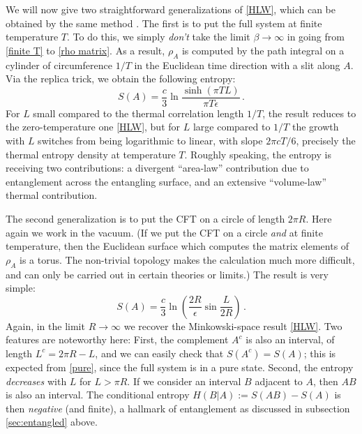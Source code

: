 \documentclass[11pt]{article}
\begin{document}
We will now give two straightforward generalizations of \eqref{HLW}, which can be obtained by the same method \cite{Calabrese:2004eu}. The first is to put the full system at finite temperature $T$. To do this, we simply \emph{don't} take the limit $\beta\to\infty$ in going from \eqref{finite T} to \eqref{rho matrix}. As a result, $\rho_A$ is computed by the path integral on a cylinder of circumference $1/T$ in the Euclidean time direction with a slit along $A$. Via the replica trick, we obtain the following entropy:
\begin{equation}\label{thermal line}
S(A) = \frac c3\ln\frac{\sinh(\pi TL)}{\pi T\epsilon}\,.
\end{equation}
For $L$ small compared to the thermal correlation length $1/T$, the result reduces to the zero-temperature one \eqref{HLW}, but for $L$ large compared to $1/T$ the growth with $L$ switches from being logarithmic to linear, with slope $2\pi cT/6$, precisely the thermal entropy density at temperature $T$. Roughly speaking, the entropy is receiving two contributions: a divergent ``area-law'' contribution due to entanglement across the entangling surface, and an extensive ``volume-law'' thermal contribution.

The second generalization is to put the CFT on a circle of length $2\pi R$. Here again we work in the vacuum. (If we put the CFT on a circle \emph{and} at finite temperature, then the Euclidean surface which computes the matrix elements of $\rho_A$ is a torus. The non-trivial topology makes the calculation much more difficult, and can only be carried out in certain theories or limits.) The result is very simple:
\begin{equation}\label{circle EE}
S(A) = \frac c3\ln\left(\frac{2R}\epsilon\sin\frac L{2R}\right)\,.
\end{equation}
Again, in the limit $R\to\infty$ we recover the Minkowski-space result \eqref{HLW}. Two features are noteworthy here: First, the complement $A^c$ is also an interval, of length $L^c=2\pi R-L$, and we can easily check that $S(A^c)=S(A)$; this is expected from \eqref{pure}, since the full system is in a pure state. Second, the entropy \emph{decreases} with $L$ for $L>\pi R$. If we consider an interval $B$ adjacent to $A$, then $AB$ is also an interval. The conditional entropy $H(B|A):=S(AB)-S(A)$ is then \emph{negative} (and finite), a hallmark of entanglement as discussed in subsection \ref{sec:entangled} above.
\end{document}
